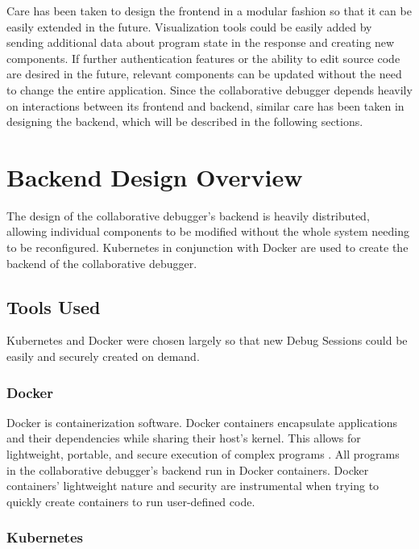 \documentclass[12pt]{article}
\begin{document}
Care has been taken to design the frontend in a modular fashion so
that it can be easily extended in the future.  Visualization tools
could be easily added by sending additional data about program state
in the response and creating new components.  If further
authentication features or the ability to edit source code are desired
in the future, relevant components can be updated without the need to
change the entire application.  Since the collaborative debugger
depends heavily on interactions between its frontend and backend,
similar care has been taken in designing the backend, which will be
described in the following sections.

\section{Backend Design Overview}

The design of the collaborative debugger's backend is heavily
distributed, allowing individual components to be modified without the
whole system needing to be reconfigured.  Kubernetes in conjunction
with Docker are used to create the backend of the collaborative
debugger.

\subsection{Tools Used}

Kubernetes and Docker were chosen largely so that new Debug Sessions
could be easily and securely created on demand.

\subsubsection{Docker}\label{docker}

Docker is containerization software.  Docker containers encapsulate
applications and their dependencies while sharing their host's kernel.
This allows for lightweight, portable, and secure execution of complex
programs \cite{docker}.  All programs in the collaborative debugger's
backend run in Docker containers.  Docker containers' lightweight
nature and security are instrumental when trying to quickly create
containers to run user-defined code.

\subsubsection{Kubernetes}\label{k8s}
\end{document}
